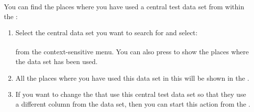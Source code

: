 
You can find the places where you have used a central test data set from within the \gddataeditor{}:

\begin{enumerate}
\item Select the central data set you want to search for and select:\\
\\
from the context-sensitive menu. 
You can also press  to show the places where the data set has been used.
\item All the places where you have used this data set in this \gdproject{} will be shown in the  .
\item If you want to change the \gdcases{} that use this central test data set so that they use a different column from the data set, then you can start this action from the \gdsearchresultview{} .
\end{enumerate}
